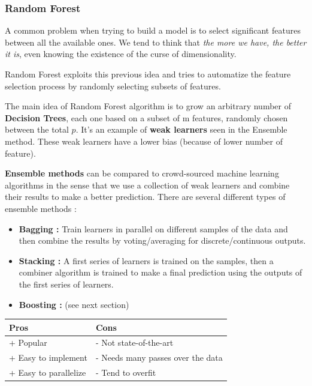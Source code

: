 \subsubsection{Random Forest}

A common problem when trying to build a model is to select significant features between all the available ones. We tend to think that \textit{the more we have, the better it is}, even knowing the existence of the curse of dimensionality. 

Random Forest exploits this previous idea and tries to automatize the feature selection process by randomly selecting subsets of features.

The main idea of Random Forest algorithm is to grow an arbitrary number of \textbf{Decision Trees}, each one based on a subset of m features, randomly chosen between the total $p$. It's an example of \textbf{weak learners} seen in the Ensemble method. These weak learners have a lower bias (because of lower number of feature).

\textbf{Ensemble methods} can be compared to crowd-sourced machine learning algorithms in the sense that we use a collection of weak learners and combine their results to make a better prediction. There are several different types of ensemble methods : 
\begin{itemize}
	\item \textbf{Bagging :} Train learners in parallel on different samples of the data and then combine the results by voting/averaging for discrete/continuous outputs.
	\item \textbf{Stacking :} A first series of learners is trained on the samples, then a combiner algorithm is trained to make a final prediction using the outputs of the first series of learners.
	\item \textbf{Boosting :} (see next section)  
\end{itemize}

\begin{center} %
\begin{tabular} {| l | l |}
\hline
\bf Pros & \bf Cons \\ \hline
+ Popular & - Not state-of-the-art  \\
+ Easy to implement & - Needs many passes over the data \\
+ Easy to parallelize & - Tend to overfit \\ 
\hline
\end{tabular}
\end{center}

